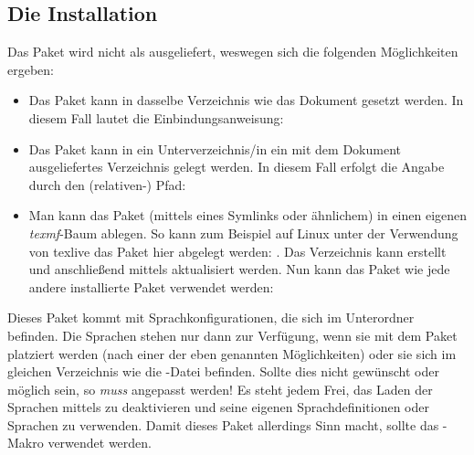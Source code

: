 \documentclass{sopra-base}
\begin{document}
\subsection{Die Installation}
    Das Paket wird nicht als  ausgeliefert, weswegen sich die
    folgenden Möglichkeiten ergeben:
    \begin{itemize}
        \item Das Paket kann in dasselbe Verzeichnis wie das Dokument
                gesetzt werden. In diesem Fall lautet die Einbindungsanweisung:
\begin{plainlatex}
\usepackage{sopra-listings}
\end{plainlatex}
        \item Das Paket kann in ein Unterverzeichnis/in ein mit
                dem Dokument ausgeliefertes Verzeichnis gelegt werden. In
                diesem Fall erfolgt die Angabe durch den (relativen-) Pfad:
\begin{plainlatex}
\usepackage{./Mein/Pfad/zu/sopra-listings}
\end{plainlatex}
        \item Man kann das Paket (mittels eines Symlinks oder ähnlichem)
              in einen eigenen \emph{texmf}-Baum ablegen.
              So kann zum Beispiel auf Linux unter der Verwendung von texlive
              das Paket hier abgelegt werden: .
              Das Verzeichnis kann erstellt und anschließend mittels
               aktualisiert werden. Nun kann
              das Paket wie jede andere installierte Paket verwendet werden:
\begin{plainlatex}
\usepackage{sopra-listings}
\end{plainlatex}
    \end{itemize}

     Dieses Paket kommt mit Sprachkonfigurationen, die sich im Unterordner  befinden. Die Sprachen stehen nur dann zur Verfügung,
    wenn sie mit dem Paket platziert werden (nach einer der eben genannten Möglichkeiten) oder sie sich im gleichen Verzeichnis wie die \LaTeXe-Datei befinden. Sollte dies
    nicht gewünscht oder möglich sein, so \emph{muss}  angepasst werden! Es steht jedem Frei, das Laden der Sprachen mittels  zu deaktivieren und seine eigenen Sprachdefinitionen
    oder Sprachen zu verwenden. Damit dieses Paket allerdings Sinn macht, sollte das -Makro verwendet werden.
\end{document}
